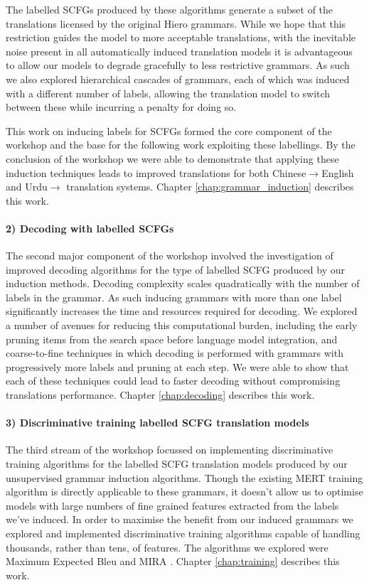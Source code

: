 The labelled SCFGs produced by these algorithms generate a subset of the translations licensed by the original Hiero grammars.
While we hope that this restriction guides the model to more acceptable translations, with the inevitable noise present in all automatically induced translation models it is advantageous to allow our models to degrade gracefully to less restrictive grammars.
As such we also explored hierarchical cascades of grammars, each of which was induced with a different number of labels, allowing the translation model to switch between these while incurring a penalty for doing so.

This work on inducing labels for SCFGs formed the core component of the workshop and the base for the following work exploiting these labellings. 
By the conclusion of the workshop we were able to demonstrate that applying these induction techniques leads to improved translations for both Chinese$\rightarrow$English and Urdu$\rightarrow$ translation systems.
Chapter \ref{chap:grammar_induction} describes this work.

\paragraph{2) Decoding with labelled SCFGs}
The second major component of the workshop involved the investigation of improved decoding algorithms for the type of labelled SCFG produced by our induction methods.
Decoding complexity scales quadratically with the number of labels in the grammar.
As such inducing grammars with more than one label significantly increases the time and resources required for decoding.
We explored a number of avenues for reducing this computational burden, including the early pruning items from the search space before language model integration, and coarse-to-fine techniques in which decoding is performed with grammars with progressively more labels and pruning at each step.
We were able to show that each of these techniques could lead to faster decoding without compromising translations performance.
Chapter \ref{chap:decoding} describes this work.

\paragraph{3) Discriminative training labelled SCFG translation models}
The third stream of the workshop focussed on implementing discriminative training algorithms for the labelled SCFG translation models produced by our unsupervised grammar induction algorithms.
Though the existing MERT \cite{och02mert} training algorithm is directly applicable to these grammars, it doesn't allow us to optimise models with large numbers of fine grained features extracted from the labels we've induced.
In order to maximise the benefit from our induced grammars we explored and implemented discriminative training algorithms capable of handling thousands, rather than tens, of features.
The algorithms we explored were Maximum Expected Bleu \cite{smith,li} and MIRA \cite{chiang}.
Chapter \ref{chap:training} describes this work.

